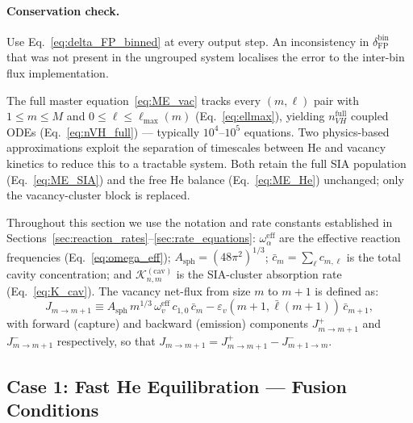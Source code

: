 \paragraph{Conservation check.}
Use Eq.~\eqref{eq:delta_FP_binned} at every output step. An
inconsistency in $\delta_{\mathrm{FP}}^{\mathrm{bin}}$ that was not
present in the ungrouped system localises the error to the inter-bin
flux implementation.



The full master equation~\eqref{eq:ME_vac} tracks every $(m,\ell)$
pair with $1 \leq m \leq M$ and $0 \leq \ell \leq \ell_{\max}(m)$
(Eq.~\ref{eq:ellmax}), yielding $n_{VH}^{\mathrm{full}}$ coupled ODEs
(Eq.~\ref{eq:nVH_full}) --- typically $10^4$--$10^5$ equations. Two
physics-based approximations exploit the separation of timescales
between He and vacancy kinetics to reduce this to a tractable system.
Both retain the full SIA population (Eq.~\ref{eq:ME_SIA}) and the free
He balance (Eq.~\ref{eq:ME_He}) unchanged; only the vacancy-cluster
block is replaced.

Throughout this section we use the notation and rate constants
established in Sections~\ref{sec:reaction_rates}--\ref{sec:rate_equations}:
$\omega_\alpha^{\mathrm{eff}}$ are the effective reaction frequencies
(Eq.~\ref{eq:omega_eff}); $A_{\mathrm{sph}} = (48\pi^2)^{1/3}$;
$\bar{c}_m = \sum_\ell c_{m,\ell}$ is the total cavity concentration;
and $\mathcal{K}_{n,m}^{(\mathrm{cav})}$ is the SIA-cluster absorption
rate (Eq.~\ref{eq:K_cav}). The vacancy net-flux from size $m$ to $m+1$
is defined as:
\begin{equation}\label{eq:Jv}
    J_{m \to m+1}
    \equiv A_{\mathrm{sph}}\,m^{1/3}\,\omega_v^{\mathrm{eff}}\,
           c_{1,0}\,\bar{c}_m
         - \varepsilon_v(m{+}1,\bar{\ell}(m{+}1))\,\bar{c}_{m+1},
\end{equation}
with forward (capture) and backward (emission) components
$J_{m\to m+1}^{+}$ and $J_{m\to m+1}^{-}$ respectively, so that
$J_{m\to m+1} = J_{m\to m+1}^{+} - J_{m+1\to m}^{-}$.

\subsection{Case 1: Fast He Equilibration --- Fusion Conditions}
\label{sec:case1}

